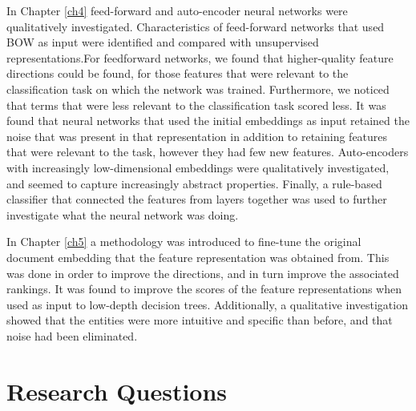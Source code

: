 In Chapter \ref{ch4} feed-forward and auto-encoder neural networks were qualitatively investigated. Characteristics of feed-forward networks that used BOW as input were identified and compared with unsupervised representations.For feedforward networks, we found that higher-quality feature directions could be found, for those features that were relevant to the classification task on which the network was trained. Furthermore, we noticed that terms that were less relevant to the classification task scored less. It was found that neural networks that used the initial embeddings as input retained the noise that was present in that representation in addition to retaining features that were relevant to the task, however they had few new features. Auto-encoders with increasingly low-dimensional embeddings were qualitatively investigated, and seemed to capture increasingly abstract properties. Finally,  a rule-based classifier that connected the features from layers together was used to further investigate what the neural network was doing. %

In Chapter \ref{ch5} a methodology was introduced to fine-tune the original document embedding that the feature representation was obtained from. This was done in order to improve the directions, and in turn improve the associated rankings. It was found to improve the scores of the feature representations when used as input to low-depth decision trees. Additionally, a qualitative investigation showed that the entities were more intuitive and specific than before, and that noise had been eliminated.






\section{Research Questions}

